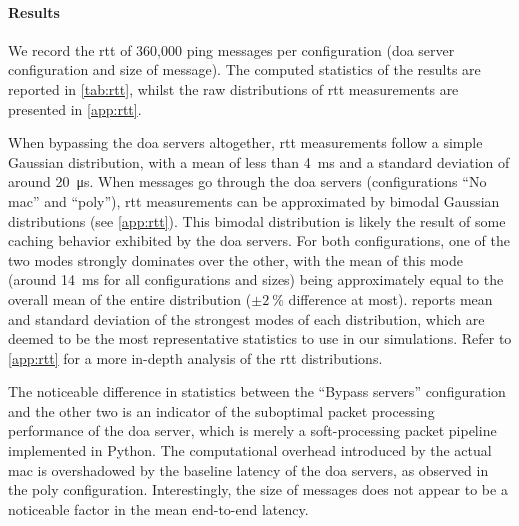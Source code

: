 \paragraph{Results}

We record the \acrlong{rtt} of 360,000 ping messages per configuration (\acrshort{doa} server
configuration and size of message). The computed statistics of the results are reported in
\cref{tab:rtt}, whilst the raw distributions of \acrshort{rtt} measurements are presented in
\cref{app:rtt}.

When bypassing the \acrshort{doa} servers altogether, \acrshort{rtt} measurements follow a simple
Gaussian distribution, with a mean of less than \qty{4}{\ms} and a standard deviation of around
\qty{20}{\us}. When messages go through the \acrshort{doa} servers (configurations ``No
\acrshort{mac}'' and ``\acrshort{poly}''), \acrshort{rtt} measurements can be approximated by
bimodal Gaussian distributions (see \cref{app:rtt}). This bimodal distribution is likely the result
of some caching behavior exhibited by the \acrshort{doa} servers. For both configurations, one of
the two modes strongly dominates over the other, with the mean of this mode (around \qty{14}{\ms}
for all configurations and sizes) being approximately equal to the overall mean of the entire
distribution ($\pm\qty{2}{\percent}$ difference at most).  reports mean and standard
deviation of the strongest modes of each distribution, which are deemed to be the most
representative statistics to use in our simulations. Refer to \cref{app:rtt} for a more in-depth
analysis of the \acrshort{rtt} distributions.

The noticeable difference in statistics between the ``Bypass servers'' configuration and the other
two is an indicator of the suboptimal packet processing performance of the \acrshort{doa} server,
which is merely a soft-processing packet pipeline implemented in Python. The computational overhead
introduced by the actual \acrshort{mac} is overshadowed by the baseline latency of the
\acrshort{doa} servers, as observed in the \acrshort{poly} configuration. Interestingly, the size of
messages does not appear to be a noticeable factor in the mean end-to-end latency.

